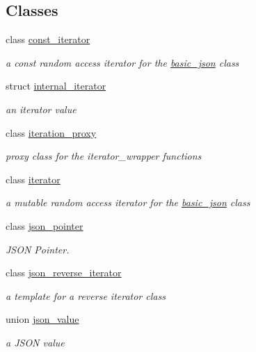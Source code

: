 \subsection*{Classes}
\begin{DoxyCompactItemize}
\item 
class \hyperlink{classnlohmann_1_1basic__json_1_1const__iterator}{const\+\_\+iterator}
\begin{DoxyCompactList}\small\item\em a const random access iterator for the \hyperlink{classnlohmann_1_1basic__json}{basic\+\_\+json} class \end{DoxyCompactList}\item 
struct \hyperlink{structnlohmann_1_1basic__json_1_1internal__iterator}{internal\+\_\+iterator}
\begin{DoxyCompactList}\small\item\em an iterator value \end{DoxyCompactList}\item 
class \hyperlink{classnlohmann_1_1basic__json_1_1iteration__proxy}{iteration\+\_\+proxy}
\begin{DoxyCompactList}\small\item\em proxy class for the iterator\+\_\+wrapper functions \end{DoxyCompactList}\item 
class \hyperlink{classnlohmann_1_1basic__json_1_1iterator}{iterator}
\begin{DoxyCompactList}\small\item\em a mutable random access iterator for the \hyperlink{classnlohmann_1_1basic__json}{basic\+\_\+json} class \end{DoxyCompactList}\item 
class \hyperlink{classnlohmann_1_1basic__json_1_1json__pointer}{json\+\_\+pointer}
\begin{DoxyCompactList}\small\item\em J\+S\+ON Pointer. \end{DoxyCompactList}\item 
class \hyperlink{classnlohmann_1_1basic__json_1_1json__reverse__iterator}{json\+\_\+reverse\+\_\+iterator}
\begin{DoxyCompactList}\small\item\em a template for a reverse iterator class \end{DoxyCompactList}\item 
union \hyperlink{unionnlohmann_1_1basic__json_1_1json__value}{json\+\_\+value}
\begin{DoxyCompactList}\small\item\em a J\+S\+ON value \end{DoxyCompactList}\item 

\end{DoxyCompactItemize}
